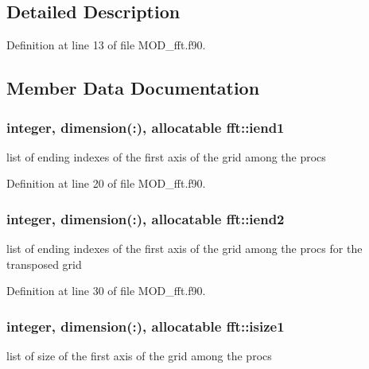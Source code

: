 \subsection{Detailed Description}


Definition at line 13 of file M\-O\-D\-\_\-fft.\-f90.



\subsection{Member Data Documentation}
\hypertarget{classfft_af7c211bc5279a97bd104e261d7c42909}{
\subsubsection[{iend1}]{\setlength{\rightskip}{0pt plus 5cm}integer, dimension(\-:), allocatable fft\-::iend1}}\label{classfft_af7c211bc5279a97bd104e261d7c42909}


list of ending indexes of the first axis of the grid among the procs 



Definition at line 20 of file M\-O\-D\-\_\-fft.\-f90.

\hypertarget{classfft_a8b21d9cc8827918443dc2864780d0b8e}{
\subsubsection[{iend2}]{\setlength{\rightskip}{0pt plus 5cm}integer, dimension(\-:), allocatable fft\-::iend2}}\label{classfft_a8b21d9cc8827918443dc2864780d0b8e}


list of ending indexes of the first axis of the grid among the procs for the transposed grid 



Definition at line 30 of file M\-O\-D\-\_\-fft.\-f90.

\hypertarget{classfft_a8b6be0b5847c18ae92ab7e4cdc6797ae}{
\subsubsection[{isize1}]{\setlength{\rightskip}{0pt plus 5cm}integer, dimension(\-:), allocatable fft\-::isize1}}\label{classfft_a8b6be0b5847c18ae92ab7e4cdc6797ae}


list of size of the first axis of the grid among the procs 



